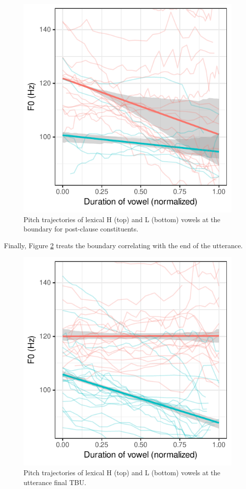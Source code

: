 \documentclass[
  11pt,
  b5paper,
]{article}
\begin{document}
\begin{figure}
\centering
\includegraphics{figure/vowel-pitch-HL-postclause-manual-1.pdf}
\caption{Pitch trajectories of lexical H (top) and L (bottom) vowels at
the boundary for post-clause
constituents.\label{fig:vowel_pitch_HL_postclause_manual}}
\end{figure}

Finally, Figure \ref{fig:vowel_pitch_HL_uttfinal_manual} treats the
boundary correlating with the end of the utterance.

\begin{figure}
\centering
\includegraphics{figure/vowel-pitch_HL-uttfinal-manual-1.pdf}
\caption{Pitch trajectories of lexical H (top) and L (bottom) vowels at
the utterance final TBU.\label{fig:vowel_pitch_HL_uttfinal_manual}}
\end{figure}
\end{document}
